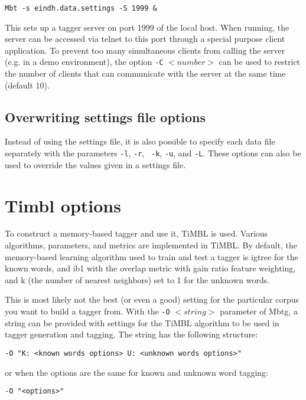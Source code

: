 \documentclass{report}
\begin{document}
{\small
\begin{verbatim}
Mbt -s eindh.data.settings -S 1999 &
\end{verbatim}
}

This sets up a tagger server on port 1999 of the local host. When
running, the server can be accessed via telnet to this port through a
special purpose client application. To prevent too many simultaneous
clients from calling the server (e.g. in a demo environment), the
option {\tt -C} $<number>$ can be used to restrict the number of
clients that can communicate with the server at the same time (default
10).


\subsection{Overwriting settings file options}

Instead of using the settings file, it is also possible to specify
each data file separately with the parameters {\tt -l}, {\tt -r}, {\tt
-k}, {\tt -u}, and {\tt -L}. These options can also be used to
override the values given in a settings file.

\section{Timbl options}

To construct a memory-based tagger and use it, TiMBL is
used. Various algorithms, parameters, and metrics are implemented in
TiMBL. By default, the memory-based learning algorithm used to
train and test a tagger is {\sc igtree} for the known words, and {\sc
ib1} with the overlap metric with gain ratio feature weighting, and k
(the number of nearest neighbors) set to 1 for the unknown words.

This is most likely not the best (or even a good) setting for the
particular corpus you want to build a tagger from.  With the {\tt -O} 
$<string>$ parameter of Mbtg, a string can be provided with
settings for the TiMBL algorithm to be used in tagger generation
and tagging. The string has the following structure:

{\small
\begin{verbatim}
-O "K: <known words options> U: <unknown words options>" 
\end{verbatim}
}

or when the options are the same for known and unknown word tagging: 

{\small
\begin{verbatim}
-O "<options>"
\end{verbatim}
}
\end{document}
